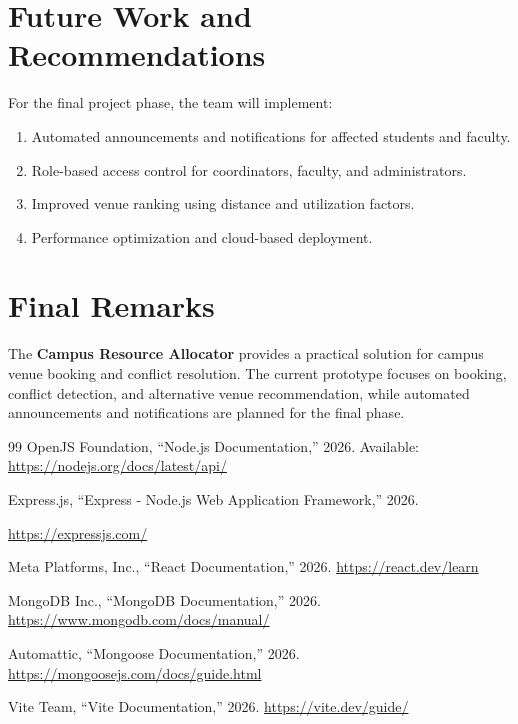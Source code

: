 \documentclass[12pt, a4paper, oneside]{report}
\begin{document}
\section{Future Work and Recommendations}

For the final project phase, the team will implement:
\begin{enumerate}
    \item Automated announcements and notifications for affected students and faculty.
    \item Role-based access control for coordinators, faculty, and administrators.
    \item Improved venue ranking using distance and utilization factors.
    \item Performance optimization and cloud-based deployment.
\end{enumerate}

\section{Final Remarks}

The \textbf{Campus Resource Allocator} provides a practical solution for campus venue booking and conflict resolution. The current prototype focuses on booking, conflict detection, and alternative venue recommendation, while automated announcements and notifications are planned for the final phase.
\begin{thebibliography}{99}
OpenJS Foundation, ``Node.js Documentation,'' 2026.
Available: \url{https://nodejs.org/docs/latest/api/}

Express.js, ``Express - Node.js Web Application Framework,'' 2026.

 \url{https://expressjs.com/}

Meta Platforms, Inc., ``React Documentation,'' 2026.
\url{https://react.dev/learn}

MongoDB Inc., ``MongoDB Documentation,'' 2026.
 \url{https://www.mongodb.com/docs/manual/}

Automattic, ``Mongoose Documentation,'' 2026.
 \url{https://mongoosejs.com/docs/guide.html}

Vite Team, ``Vite Documentation,'' 2026.
 \url{https://vite.dev/guide/}

\end{thebibliography}
\end{document}
